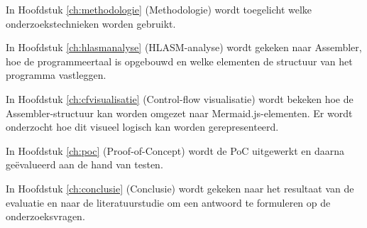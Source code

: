 In Hoofdstuk \ref{ch:methodologie} (Methodologie) wordt toegelicht welke onderzoekstechnieken worden gebruikt.

In Hoofdstuk \ref{ch:hlasmanalyse} (HLASM-analyse) wordt gekeken naar Assembler, hoe de programmeertaal is opgebouwd en welke elementen de structuur van het programma vastleggen. 

In Hoofdstuk \ref{ch:cfvisualisatie} (Control-flow visualisatie) wordt bekeken hoe de Assembler-structuur kan worden omgezet naar Mermaid.js-elementen. Er wordt onderzocht hoe dit visueel logisch kan worden gerepresenteerd. 

In Hoofdstuk \ref{ch:poc} (Proof-of-Concept) wordt de PoC uitgewerkt en daarna geëvalueerd aan de hand van testen. 

In Hoofdstuk \ref{ch:conclusie} (Conclusie) wordt gekeken naar het resultaat van de evaluatie en naar de literatuurstudie om een antwoord te formuleren op de onderzoeksvragen.  







